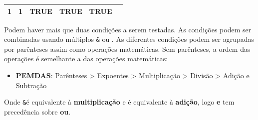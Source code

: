 \documentclass[]{book}
\providecommand{\tightlist}{%
  \setlength{\itemsep}{0pt}\setlength{\parskip}{0pt}}
\begin{document}
\begin{longtable}[]{@{}cccccc@{}}
\begin{minipage}[t]{0.05\columnwidth}
1\strut
\end{minipage} & \begin{minipage}[t]{0.05\columnwidth}\centering\strut
1\strut
\end{minipage} & \begin{minipage}[t]{0.09\columnwidth}\centering\strut
TRUE\strut
\end{minipage} & \begin{minipage}[t]{0.09\columnwidth}\centering\strut
TRUE\strut
\end{minipage} & \begin{minipage}[t]{0.21\columnwidth}\centering\strut
TRUE\strut
\end{minipage} & \begin{minipage}[t]{0.21\columnwidth}\centering\strut
\strut
\end{minipage}\tabularnewline
\bottomrule
\end{longtable}

Podem haver mais que duas condições a serem testadas. As condições podem
ser combinadas usando múltiplos \texttt{\&} ou \texttt{\textbar{}}. As
diferentes condições podem ser agrupadas por parênteses assim como
operações matemáticas. Sem parênteses, a ordem das operações é
semelhante a das operações matemáticas:

\begin{itemize}
\tightlist
\item
  \textbf{PEMDAS}: Parênteses \textgreater{} Expoentes \textgreater{}
  Multiplicação \textgreater{} Divisão \textgreater{} Adição e Subtração
\end{itemize}

Onde \texttt{\&}é equivalente à \textbf{multiplicação} e
\texttt{\textbar{}} é equivalente à \textbf{adição}, logo \textbf{e} tem
precedência sobre \textbf{ou}.
\end{document}

